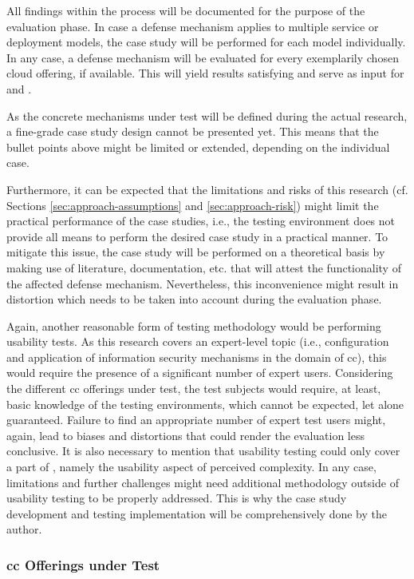 {		All findings within the process will be documented for the purpose of the evaluation phase. In case a defense mechanism applies to multiple service or deployment models, the case study will be performed for each model individually. In any case, a defense mechanism will be evaluated for every exemplarily chosen cloud offering, if available. This will yield results satisfying  and serve as input for  and .
		
		As the concrete mechanisms under test will be defined during the actual research, a fine-grade case study design cannot be presented yet. This means that the bullet points above might be limited or extended, depending on the individual case.
		
		Furthermore, it can be expected that the limitations and risks of this research (cf. Sections \ref{sec:approach-assumptions} and \ref{sec:approach-risk}) might limit the practical performance of the case studies, i.e., the testing environment does not provide all means to perform the desired case study in a practical manner. To mitigate this issue, the case study will be performed on a theoretical basis by making use of literature, documentation, etc. that will attest the functionality of the affected defense mechanism. Nevertheless, this inconvenience might result in distortion which needs to be taken into account during the evaluation phase.
		
		Again, another reasonable form of testing methodology would be performing usability tests. As this research covers an expert-level topic (i.e., configuration and application of information security mechanisms in the domain of \ac{cc}), this would require the presence of a significant number of expert users. Considering the different \ac{cc} offerings under test, the test subjects would require, at least, basic knowledge of the testing environments, which cannot be expected, let alone guaranteed. Failure to find an appropriate number of expert test users might, again, lead to biases and distortions that could render the evaluation less conclusive. It is also necessary to mention that usability testing could only cover a part of , namely the usability aspect of perceived complexity. In any case, limitations and further challenges might need additional methodology outside of usability testing to be properly addressed. This is why the case study development and testing implementation will be comprehensively done by the author.
			
		\subsubsection{\acs{cc} Offerings under Test} \label{subsubsec:approach-structure-testing-offerings}
	
}
